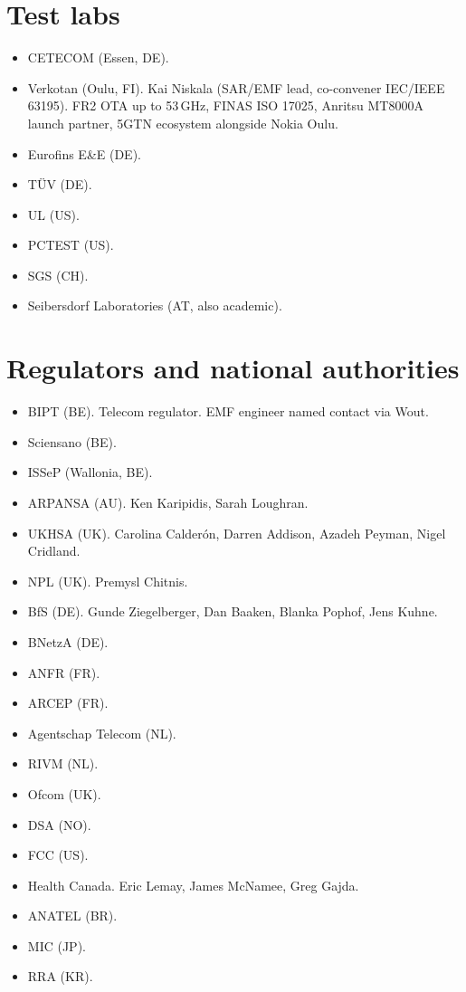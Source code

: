 \documentclass[10pt,a4paper]{article}
\begin{document}
\section{Test labs}
\begin{itemize}
  \item CETECOM (Essen, DE).
  \item Verkotan (Oulu, FI). Kai Niskala (SAR/EMF lead, co-convener IEC/IEEE 63195). FR2 OTA up to 53\,GHz, FINAS ISO 17025, Anritsu MT8000A launch partner, 5GTN ecosystem alongside Nokia Oulu.
  \item Eurofins E\&E (DE).
  \item T\"UV (DE).
  \item UL (US).
  \item PCTEST (US).
  \item SGS (CH).
  \item Seibersdorf Laboratories (AT, also academic).
\end{itemize}

\section{Regulators and national authorities}
\begin{itemize}
  \item BIPT (BE). Telecom regulator. EMF engineer named contact via Wout.
  \item Sciensano (BE).
  \item ISSeP (Wallonia, BE).
  \item ARPANSA (AU). Ken Karipidis, Sarah Loughran.
  \item UKHSA (UK). Carolina Calder\'on, Darren Addison, Azadeh Peyman, Nigel Cridland.
  \item NPL (UK). Premysl Chitnis.
  \item BfS (DE). Gunde Ziegelberger, Dan Baaken, Blanka Pophof, Jens Kuhne.
  \item BNetzA (DE).
  \item ANFR (FR).
  \item ARCEP (FR).
  \item Agentschap Telecom (NL).
  \item RIVM (NL).
  \item Ofcom (UK).
  \item DSA (NO).
  \item FCC (US).
  \item Health Canada. Eric Lemay, James McNamee, Greg Gajda.
  \item ANATEL (BR).
  \item MIC (JP).
  \item RRA (KR).
\end{itemize}
\end{document}
